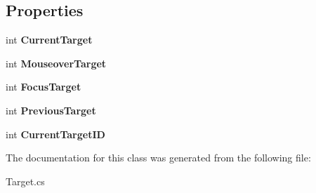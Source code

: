\subsection*{Properties}
\begin{DoxyCompactItemize}
\item 
\hypertarget{classffxivlib_1_1_target_a7dc71e5dcda40dd3d2e1187c0322e832}{int {\bfseries Current\-Target}}\label{classffxivlib_1_1_target_a7dc71e5dcda40dd3d2e1187c0322e832}

\item 
\hypertarget{classffxivlib_1_1_target_ab7ca016a549a6d2621010523ea2f4b9f}{int {\bfseries Mouseover\-Target}}\label{classffxivlib_1_1_target_ab7ca016a549a6d2621010523ea2f4b9f}

\item 
\hypertarget{classffxivlib_1_1_target_af06247ed5e1779a1af050ad1ebdf0f9c}{int {\bfseries Focus\-Target}}\label{classffxivlib_1_1_target_af06247ed5e1779a1af050ad1ebdf0f9c}

\item 
\hypertarget{classffxivlib_1_1_target_afec2ed018ca78d593b3c40b1bfd03c42}{int {\bfseries Previous\-Target}}\label{classffxivlib_1_1_target_afec2ed018ca78d593b3c40b1bfd03c42}

\item 
\hypertarget{classffxivlib_1_1_target_a8af5ace3db90633c7961a381a24566cf}{int {\bfseries Current\-Target\-I\-D}}\label{classffxivlib_1_1_target_a8af5ace3db90633c7961a381a24566cf}

\end{DoxyCompactItemize}


The documentation for this class was generated from the following file\-:\begin{DoxyCompactItemize}
\item 
Target.\-cs\end{DoxyCompactItemize}
